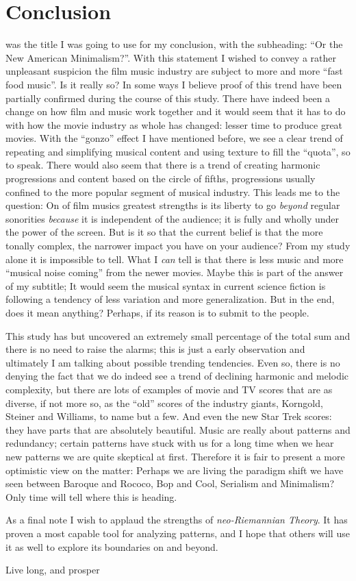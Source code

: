 
\chapter{Conclusion}\label{ch:conclusion}

 was the title I was going to use for my conclusion, with the subheading: ``Or the New American Minimalism?''. With this statement I wished to convey a rather unpleasant suspicion the film music industry are subject to more and more ``fast food music''. Is it really so? In some ways I believe proof of this trend have been partially confirmed during the course of this study. There have indeed been a change on how film and music work together and it would seem that it has to do with how the movie industry as whole has changed: lesser time to produce great movies. With the ``gonzo'' effect I have mentioned before, we see a clear trend of repeating and simplifying musical content and using texture to fill the ``quota'', so to speak. There would also seem that there is a trend of creating harmonic progressions and content based on the circle of fifths, progressions usually confined to the more popular segment of musical industry. This leads me to the question: On of film musics greatest strengths is its liberty to go \textit{beyond} regular sonorities \textit{because} it is independent of the audience; it is fully and wholly under the power of the screen. But is it so that the current belief is that the more tonally complex, the narrower impact you have on your audience? From my study alone it is impossible to tell. What I \textit{can} tell is that there is less music and more ``musical noise coming'' from the newer movies. Maybe this is part of the answer of my subtitle; It would seem the musical syntax in current science fiction is following a tendency of less variation and more generalization. But in the end, does it mean anything? Perhaps, if its reason is to submit to the people.

This study has but uncovered an extremely small percentage of the total sum and there is no need to raise the alarms; this is just a early observation and ultimately I am talking about possible trending tendencies. Even so, there is no denying the fact that we do indeed see a trend of declining harmonic and melodic complexity, but there are lots of examples of movie and TV scores that are as diverse, if not more so, as the ``old'' scores of the industry giants, Korngold, Steiner and Williams, to name but a few. And even the new Star Trek scores: they have parts that are absolutely beautiful. Music are really about patterns and redundancy; certain patterns have stuck with us for a long time when we hear new patterns we are quite skeptical at first. Therefore it is fair to present a more optimistic view on the matter: Perhaps we are living the paradigm shift we have seen between Baroque and Rococo, Bop and Cool, Serialism and Minimalism? Only time will tell where this is heading.

As a final note I wish to applaud the strengths of \textit{neo-Riemannian Theory}. It has proven a most capable tool for analyzing patterns, and I hope that others will use it as well to explore its boundaries on and beyond. 

\vspace{5cm}
\center
Live long, and prosper

